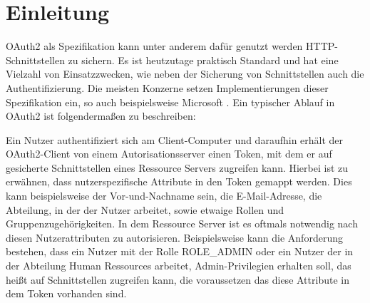 \chapter{Einleitung}
\label{ch:intro}
OAuth2 als Spezifikation kann unter anderem dafür genutzt werden \linebreak \ac{HTTP}-Schnittstellen zu sichern. Es ist heutzutage praktisch Standard und hat eine Vielzahl von Einsatzzwecken, wie neben der Sicherung von Schnittstellen auch die Authentifizierung. Die meisten Konzerne setzen Implementierungen dieser Spezifikation ein, so auch beispielsweise Microsoft \citep{microsoftoauth2:2021:07}. Ein typischer Ablauf in OAuth2 ist folgendermaßen zu beschreiben:\smallskip

Ein Nutzer authentifiziert sich am Client-Computer und daraufhin erhält der OAuth2-Client von einem Autorisationsserver einen Token, mit dem er auf gesicherte Schnittstellen eines Ressource Servers zugreifen kann. Hierbei ist zu erwähnen, dass nutzerspezifische Attribute in den Token gemappt werden. Dies kann beispielsweise der Vor-und-Nachname sein, die E-Mail-Adresse, die Abteilung, in der der Nutzer arbeitet, sowie etwaige Rollen und Gruppenzugehörigkeiten. In dem Ressource Server ist es oftmals notwendig nach diesen Nutzerattributen zu autorisieren. Beispielsweise kann die Anforderung bestehen, dass ein Nutzer mit der Rolle ROLE\_ADMIN oder ein Nutzer der in der Abteilung Human Ressources arbeitet, Admin-Privilegien erhalten soll, das heißt auf Schnittstellen zugreifen kann, die voraussetzen das diese Attribute in dem Token vorhanden sind.\smallskip

